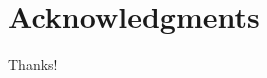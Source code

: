 \documentclass{sig-alternate-2013}
\begin{document}

\section{Acknowledgments}
Thanks!

%

%
%
\end{document}
